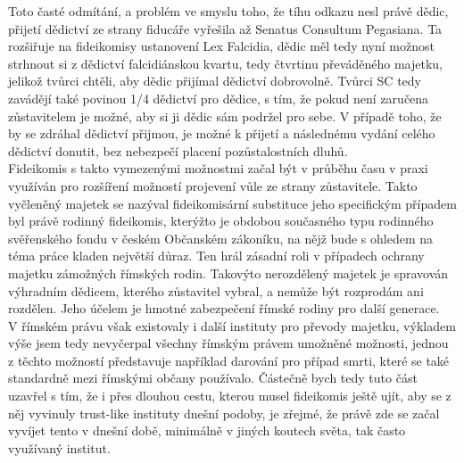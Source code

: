 \documentclass{article}
\begin{document}
Toto časté odmítání, a problém ve smyslu toho, že tíhu odkazu nesl právě dědic, přijetí dědictví ze strany fiducáře vyřešila až Senatus Consultum Pegasiana. Ta rozšiřuje na fideikomisy ustanovení Lex Falcidia, dědic měl tedy nyní možnost strhnout si z dědictví falcidiánskou kvartu, tedy čtvrtinu převáděného majetku, jelikož tvůrci chtěli, aby dědic přijímal dědictví dobrovolně. Tvůrci SC tedy zavádějí také povinou 1/4 dědictví pro dědice, s tím, že pokud není zaručena zůstavitelem je možné, aby si ji dědic sám podržel pro sebe. V případě toho, že by se zdráhal dědictví přijmou, je možné k přijetí a následnému vydání celého dědictví donutit, bez nebezpečí placení pozůstalostních dluhů.\\

Fideikomis s takto vymezenými možnostmi začal být v průběhu času v praxi využíván pro rozšíření možností projevení vůle ze strany zůstavitele. Takto vyčleněný majetek se nazýval fideikomisární substituce jeho specifickým případ\-em byl právě rodinný fideikomis, kterýžto je obdobou současného typu rodinného svěřenského fondu v českém Občanském zákoníku, na nějž bude s ohledem na téma práce kladen největší důraz. Ten hrál zásadní roli v případech ochrany majetku zámožných římských rodin. Takovýto nerozdělený majetek je spravován výhradním dědicem, kterého zůstavitel vybral, a nemůže být rozprodám ani rozdělen. Jeho účelem je hmotné zabezpečení římské rodiny pro další generace.\\

V římském právu však existovaly i další instituty pro převody majetku, výkladem výše jsem tedy nevyčerpal všechny římským právem umožněné mož\-nosti, jednou z těchto možností představuje například darování pro případ smrti, které se také standardně mezi římskými občany používalo. Částečně bych tedy tuto část uzavřel s tím, že i přes dlouhou cestu, kterou musel fideikomis ještě ujít, aby se z něj vyvinuly trust-like instituty dnešní podoby, je zřejmé, že právě zde se začal vyvíjet tento v dnešní době, minimálně v jiných koutech světa, tak často využívaný institut.\\


\end{document}
